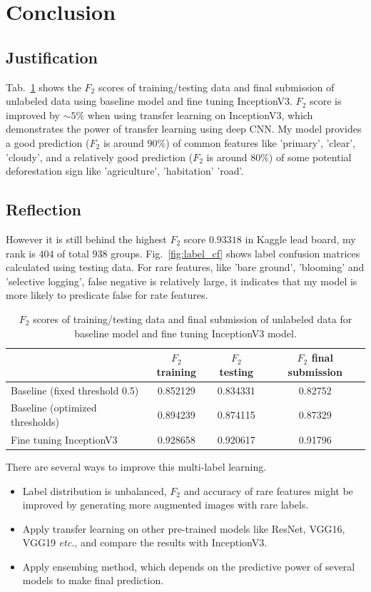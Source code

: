\documentclass[11pt,oneside,a4paper]{article}
\begin{document}
\section{Conclusion}
\subsection{Justification}
Tab.~\ref{tab:conclusion} shows the $F_2$ scores of training/testing data and final submission of unlabeled data using baseline model and fine tuning InceptionV3. $F_2$ score is improved by $\sim5\%$ when using transfer learning on InceptionV3, which demonstrates the power of transfer learning using deep CNN. My model provides a good prediction ($F_2$ is around $90\%$) of common features like 'primary', 'clear', 'cloudy', and a relatively good prediction ($F_2$ is around $80\%$) of some potential deforestation sign like 'agriculture', 'habitation' 'road'.

\subsection{Reflection}
However it is still behind the highest $F_2$ score $0.93318$ in Kaggle lead board, my rank is $404$ of total $938$ groups. Fig.~\ref{fig:label_cf} shows label confusion matrices calculated using testing data. For rare features, like 'bare ground', 'blooming' and 'selective logging', false negative is relatively large, it indicates that my model is more likely to predicate false for rate features.

\begin{table}[ht]
\begin{tabular}{l|c|c|c}
\hline
\hline
                          &  $F_2$ training & $F_2$ testing & $F_2$ final submission \\
 \hline
Baseline (fixed threshold 0.5)           &  0.852129       &  0.834331  & 0.82752 \\
Baseline (optimized thresholds)          &  0.894239       & 0.874115      & 0.87329 \\
Fine tuning InceptionV3   &  0.928658       & 0.920617      & 0.91796 \\\hline
\end{tabular}
\caption{$F_2$ scores of training/testing data and final submission of unlabeled data for baseline model and fine tuning InceptionV3 model.}\label{tab:conclusion}
\end{table}

There are several ways to improve this multi-label learning. 
\begin{itemize}
\item Label distribution is unbalanced, $F_2$ and accuracy of rare features might be improved by generating more augmented images with rare labels.
\item Apply transfer learning on other pre-trained models like ResNet, VGG16, VGG19 \emph{etc.}, and compare the results with InceptionV3.
\item Apply ensembing method, which depends on  the  predictive  power of several models to make final prediction. 
\end{itemize}
\end{document}
